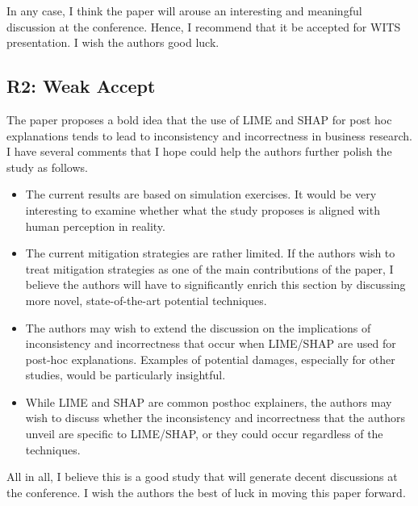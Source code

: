 \documentclass{article} %
\begin{document}
In any case, I think the paper will arouse an interesting and meaningful discussion at the conference. Hence, I recommend that it be accepted for WITS presentation. I wish the authors good luck.

\subsection{R2: Weak Accept}
The paper proposes a bold idea that the use of LIME and SHAP for post hoc explanations tends to lead to inconsistency and incorrectness in business research. I have several comments that I hope could help the authors further polish the study as follows.

\begin{itemize}
 \item The current results are based on simulation exercises. It would be very interesting to examine whether what the study proposes is aligned with human perception in reality.
 \item The current mitigation strategies are rather limited. If the authors wish to treat mitigation strategies as one of the main contributions of the paper, I believe the authors will have to significantly enrich this section by discussing more novel, state-of-the-art potential techniques.
\item The authors may wish to extend the discussion on the implications of inconsistency and incorrectness that occur when LIME/SHAP are used for post-hoc explanations. Examples of potential damages, especially for other studies, would be particularly insightful.
\item While LIME and SHAP are common posthoc explainers, the authors may wish to discuss whether the inconsistency and incorrectness that the authors unveil are specific to LIME/SHAP, or they could occur regardless of the techniques.
\end{itemize}


All in all, I believe this is a good study that will generate decent discussions at the conference. I wish the authors the best of luck in moving this paper forward.
\end{document}
